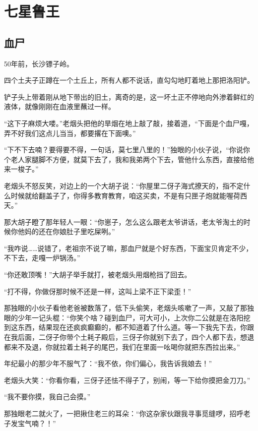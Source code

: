 
\part{七星鲁王}
\chapter{血尸}

50年前，长沙镖子岭。

四个土夫子正蹲在一个土丘上，所有人都不说话，直勾勾地盯着地上那把洛阳铲。

铲子头上带着刚从地下带出的旧土，离奇的是，这一坏土正不停地向外渗着鲜红的液体，就像刚刚在血液里蘸过一样。

“这下子麻烦大喽。”老烟头把他的旱烟在地上敲了敲，接着道，“下面是个血尸嘎，弄不好我们这点儿当当，都要撂在下面噢。”

“下不下去喃？要得要不得，一句话，莫七里八里的！”独眼的小伙子说，“你说你个老人家腿脚不方便，就莫下去了，我和我弟两个下去，管他什么东西，直接给他来一梭子。”

老烟头不怒反笑，对边上的一个大胡子说：“你屋里二伢子海式撩天的，指不定什么时候就给翻盖子了，你得多教育教育，咱这买卖，不是有只匣子炮就能喔荷西天。”

那大胡子瞪了那年轻人一眼：“你崽子，怎么这么跟老太爷讲话，老太爷淘土的时候你他妈的还在你娘肚子里吃屎咧。”

“我咋说……说错了，老祖宗不说了嘛，那血尸就是个好东西，下面宝贝肯定不少，不下去，走嘎一炉锅汤。”

“你还敢顶嘴！”大胡子举手就打，被老烟头用烟枪挡了回去。

“打不得，你做伢那时候不还是一样，这叫上梁不正下梁歪！”

那独眼的小伙子看他老爸被数落了，低下头偷笑，老烟头咳嗽了一声，又敲了那独眼的少年一记头棍：“你笑个啥？碰到血尸，可大可小，上次你二公就是在洛阳挖到这东西，结果现在还疯疯癫癫的，都不知道着了什么道。等一下我先下去，你跟在我后面，二伢子你带个土耗子殿后，三伢子你就别下去了，四个人都下去，想退都来不及退，你就拉着土耗子的尾巴，我们在里面一吆喝你就把东西拉出来。”

年纪最小的那少年不服气了：“我不依，你们偏心，我告诉我娘去！”

老烟头大笑：“你看你看，三伢子还怯不得子了，别闹，等一下给你摸把金刀刀。”

“我不要你摸，我自己会摸。”

那独眼老二就火了，一把揪住老三的耳朵：“你这杂家伙跟我寻事觅缝啰，招呼老子发宝气喃？！”

